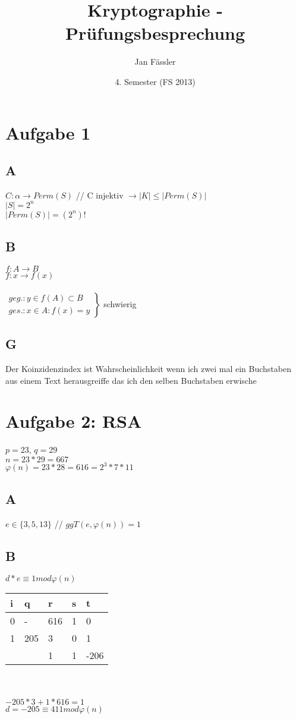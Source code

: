 \documentclass[10pt]{article}
\title{
	\vspace{5cm}
	Kryptographie - Prüfungsbesprechung
}
\author{Jan Fässler}
\date{4. Semester (FS 2013)}
\newcommand{\ra}{\rightarrow}
\newcommand{\Brackar}[2]{\left.\begin{array}{#1} #2 \end{array}\right\rbrace} %
\begin{document}
\section{Aufgabe 1}
\subsection{A}
$C: \alpha \ra Perm(S)$ // C injektiv $\ra |K| \leq |Perm(S)|$ \\
$|S| = 2^n$ \\
$|Perm(S)|=(2^n)!$
\subsection{B}
$f:A\ra B$ \\
$f:x\ra f(x)$ \\ \\
$\Brackar{l}{geg.: y \in f(A) \subset B \\ ges.: x \in A : f(x)=y}$ schwierig
\subsection{G}
Der Koinzidenzindex ist Wahrscheinlichkeit wenn ich zwei mal ein Buchstaben aus einem Text herausgreiffe das ich den selben Buchstaben erwische

\section{Aufgabe 2: RSA}
$p=23$, $q=29$ \\
$n= 23*29=667$ \\
$\varphi(n)=23*28=616=2^3*7*11$
\subsection{A}
$e \in \{3, 5, 13\}$ // $ggT(e,\varphi(n))=1$ \\
\subsection{B}
$d*e \equiv 1 mod \varphi(n)$ \\

\begin{tabular}{l l l l l}
	i & q & r & s & t \\
	\hline
	0 & - & 616 & 1 & 0 \\
	1 & 205 & 3 & 0 & 1 \\
	\hline
	& & 1 & 1 & -206
\end{tabular} \\ \\
$-205 * 3 + 1 * 616 = 1$ \\
$d= -205 \equiv 411 mod \varphi(n)$
\end{document}
